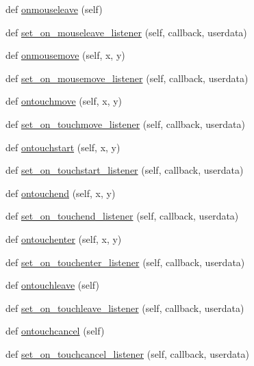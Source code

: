\begin{DoxyCompactItemize}
\item 
def \hyperlink{classremi_1_1gui_1_1Widget_aab5846ad3dc8451253f16fbd25b7440f}{onmouseleave} (self)
\item 
def \hyperlink{classremi_1_1gui_1_1Widget_ae8c8e5ba5c0d86e33260e1cebc070434}{set\+\_\+on\+\_\+mouseleave\+\_\+listener} (self, callback, userdata)
\item 
def \hyperlink{classremi_1_1gui_1_1Widget_adf1c0cfa83a0e76f4f05486dfb0873d6}{onmousemove} (self, x, y)
\item 
def \hyperlink{classremi_1_1gui_1_1Widget_a445eb69586824ebabf69ea49038310a1}{set\+\_\+on\+\_\+mousemove\+\_\+listener} (self, callback, userdata)
\item 
def \hyperlink{classremi_1_1gui_1_1Widget_a2758c6c73107f17c1f6da4a6a57208ec}{ontouchmove} (self, x, y)
\item 
def \hyperlink{classremi_1_1gui_1_1Widget_a026447b876f796e01e9fac38626826f9}{set\+\_\+on\+\_\+touchmove\+\_\+listener} (self, callback, userdata)
\item 
def \hyperlink{classremi_1_1gui_1_1Widget_a08f0da0147eee7053773f379562c879b}{ontouchstart} (self, x, y)
\item 
def \hyperlink{classremi_1_1gui_1_1Widget_a8d05b17a4f760df749dc434b797a0600}{set\+\_\+on\+\_\+touchstart\+\_\+listener} (self, callback, userdata)
\item 
def \hyperlink{classremi_1_1gui_1_1Widget_a1b179a88f650a3f54f692828027fdcb5}{ontouchend} (self, x, y)
\item 
def \hyperlink{classremi_1_1gui_1_1Widget_a5af31755de7de54804bc67259f994bb4}{set\+\_\+on\+\_\+touchend\+\_\+listener} (self, callback, userdata)
\item 
def \hyperlink{classremi_1_1gui_1_1Widget_a31b555dced51b4769d55bc04d91805c5}{ontouchenter} (self, x, y)
\item 
def \hyperlink{classremi_1_1gui_1_1Widget_a458116299aad9c6b33cd5d993d9998f5}{set\+\_\+on\+\_\+touchenter\+\_\+listener} (self, callback, userdata)
\item 
def \hyperlink{classremi_1_1gui_1_1Widget_aade8a45979f4b26a387ed25442f8e89d}{ontouchleave} (self)
\item 
def \hyperlink{classremi_1_1gui_1_1Widget_a36d7cfe63058b831f7b61ecd957714b6}{set\+\_\+on\+\_\+touchleave\+\_\+listener} (self, callback, userdata)
\item 
def \hyperlink{classremi_1_1gui_1_1Widget_a493853f8abce219cca64a11f0485c00b}{ontouchcancel} (self)
\item 
def \hyperlink{classremi_1_1gui_1_1Widget_a6ee5aee53f7266d4cd0cf6b32dae29a7}{set\+\_\+on\+\_\+touchcancel\+\_\+listener} (self, callback, userdata)
\end{DoxyCompactItemize}
